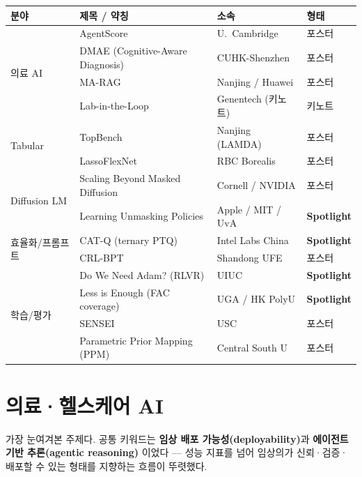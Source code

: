 \documentclass[10pt]{article}
\newcommand{\sect}[1]{\clearpage\section{#1}}
\begin{document}
\vspace{5pt}
\noindent\begin{minipage}{\linewidth}
\renewcommand{\arraystretch}{1.3}\small
\begin{tabular}{@{}p{2.6cm} p{6.2cm} p{3.8cm} p{2.2cm}@{}}
\toprule
\textbf{\color{icmlblue!88!black}분야} & \textbf{제목 / 약칭} & \textbf{소속} & \textbf{형태} \\
\midrule
\multirow{4}{*}{의료 AI}
 & AgentScore & U.\ Cambridge & 포스터 \\
 & DMAE (Cognitive-Aware Diagnosis) & CUHK-Shenzhen & 포스터 \\
 & MA-RAG & Nanjing / Huawei & 포스터 \\
 & Lab-in-the-Loop & Genentech (키노트) & 키노트 \\
\midrule
\multirow{2}{*}{Tabular}
 & TopBench & Nanjing (LAMDA) & 포스터 \\
 & LassoFlexNet & RBC Borealis & 포스터 \\
\midrule
\multirow{2}{*}{Diffusion LM}
 & Scaling Beyond Masked Diffusion & Cornell / NVIDIA & 포스터 \\
 & Learning Unmasking Policies & Apple / MIT / UvA & \textbf{Spotlight} \\
\midrule
\multirow{2}{*}{효율화/프롬프트}
 & CAT-Q (ternary PTQ) & Intel Labs China & \textbf{Spotlight} \\
 & CRL-BPT & Shandong UFE & 포스터 \\
\midrule
\multirow{4}{*}{학습/평가}
 & Do We Need Adam? (RLVR) & UIUC & \textbf{Spotlight} \\
 & Less is Enough (FAC coverage) & UGA / HK PolyU & \textbf{Spotlight} \\
 & SENSEI & USC & 포스터 \\
 & Parametric Prior Mapping (PPM) & Central South U & 포스터 \\
\bottomrule
\end{tabular}
\end{minipage}

\sect{의료·헬스케어 AI}

가장 눈여겨본 주제다. 공통 키워드는 \textbf{임상 배포 가능성(deployability)}과
\textbf{에이전트 기반 추론(agentic reasoning)} 이었다 — 성능 지표를 넘어 임상의가
신뢰·검증·배포할 수 있는 형태를 지향하는 흐름이 뚜렷했다.
\end{document}
